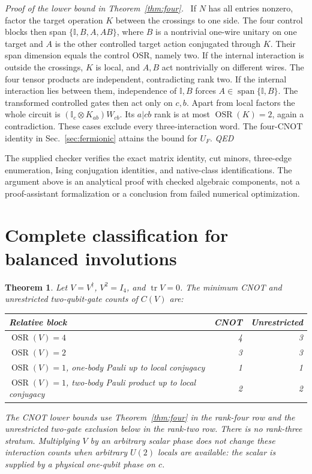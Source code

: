 \documentclass[a4paper,onecolumn,11pt,unpublished]{quantumarticle}
\newtheorem{theorem}{Theorem}
\newenvironment{proof}[1][Proof]{\par\noindent\textit{#1.}\ }{\hfill\textit{QED}\par}
\newcommand{\OSR}{\operatorname{OSR}}
\newcommand{\Id}{\mathbb I}
\begin{document}
\begin{proof}[Proof of the lower bound in Theorem~\ref{thm:four}]
If $N$ has all entries nonzero, factor the target operation $K$ between
the crossings to one side. The four control blocks then span
$\{\Id,B,A,AB\}$, where $B$ is a nontrivial one-wire unitary on one
target and $A$ is the other controlled target action conjugated through
$K$. Their span dimension equals the control OSR, namely two.
If the internal interaction is outside the crossings, $K$ is local,
and $A,B$ act nontrivially on different wires. The four tensor products
are independent, contradicting rank two. If the internal interaction
lies between them, independence of $\Id,B$ forces
$A\in\operatorname{span}\{\Id,B\}$. The transformed controlled gates
then act only on $c,b$. Apart from local factors the whole circuit is
$(\Id_c\otimes K_{ab})W_{cb}$. Its $a|cb$ rank is at most
$\OSR(K)=2$, again a contradiction. These cases exclude every
three-interaction word. The four-CNOT identity in Sec.~\ref{sec:fermionic} attains the bound for $U_F$.
\end{proof}
The supplied checker verifies the exact matrix identity, cut minors,
three-edge enumeration, Ising conjugation identities, and native-class
identifications. The argument above is an analytical proof with checked
algebraic components, not a proof-assistant formalization or a conclusion
from failed numerical optimization.


\section{Complete classification for balanced involutions}
\begin{theorem}\label{thm:balanced}
Let $V=V^\dagger$, $V^2=I_4$, and $\operatorname{tr}V=0$. The minimum
CNOT and unrestricted two-qubit-gate counts of $C(V)$ are:
\begin{center}\begin{tabular}{lrr}\toprule
Relative block & CNOT & Unrestricted\\\midrule
$\OSR(V)=4$ &4&3\\
$\OSR(V)=2$ &3&3\\
$\OSR(V)=1$, one-body Pauli up to local conjugacy &1&1\\
$\OSR(V)=1$, two-body Pauli product up to local conjugacy &2&2\\
\bottomrule\end{tabular}\end{center}
The CNOT lower bounds use Theorem~\ref{thm:four} in the rank-four row
and the unrestricted two-gate exclusion below in the rank-two row.
There is no rank-three stratum. Multiplying $V$ by an arbitrary scalar phase
does not change these interaction counts when arbitrary $U(2)$ locals are
available: the scalar is supplied by a physical one-qubit phase on $c$.
\end{theorem}
\end{document}
